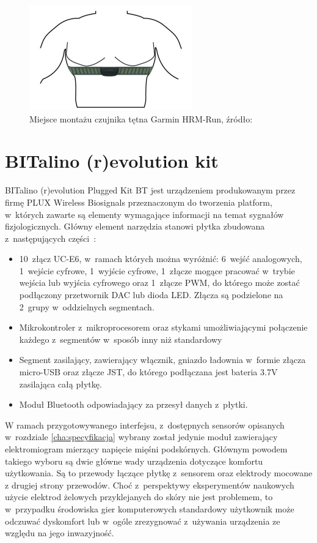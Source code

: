 \begin{figure}
	\centering
	\includegraphics[width=0.5\linewidth]{images/garmin_hrm_placement.png}
	\caption{Miejsce montażu czujnika tętna Garmin HRM-Run, źródło:~\cite{garmin_manual}}
	\label{fig:garmin_placement}
\end{figure}

\section{BITalino (r)evolution kit}
BITalino (r)evolution Plugged Kit BT jest urządzeniem produkowanym przez firmę PLUX Wireless Biosignals przeznaczonym do tworzenia platform, w~których zawarte są elementy wymagające informacji na temat sygnałów fizjologicznych. Główny element narzędzia stanowi płytka zbudowana z~następujących części~\cite{bitalino_documentation}:
\begin{itemize}
	\item 10~złącz UC-E6, w~ramach których można wyróżnić: 6~wejść analogowych, 1~wejście cyfrowe, 1~wyjście cyfrowe, 1~złącze mogące pracować w~trybie wejścia lub wyjścia cyfrowego oraz 1~złącze PWM, do którego może zostać podłączony przetwornik DAC lub dioda LED. Złącza są podzielone na 2~grupy w~oddzielnych segmentach.
	\item Mikrokontroler z~mikroprocesorem oraz stykami umożliwiającymi połączenie każdego z~segmentów w~sposób inny niż standardowy
	\item Segment zasilający, zawierający włącznik, gniazdo ładownia w~formie złącza micro-USB oraz złącze JST, do którego podłączana jest bateria 3.7V zasilająca całą płytkę.
	\item Moduł Bluetooth odpowiadający za przesył danych z~płytki.
\end{itemize}

W ramach przygotowywanego interfejsu, z~dostępnych sensorów opisanych w~rozdziale \ref{cha:specyfikacja} wybrany został jedynie moduł zawierający elektromiogram mierzący napięcie mięśni podskórnych. Głównym powodem takiego wyboru są dwie główne wady urządzenia dotyczące komfortu użytkowania. Są to przewody łączące płytkę z~sensorem oraz elektrody mocowane z drugiej strony przewodów. Choć z~perspektywy eksperymentów naukowych użycie elektrod żelowych przyklejanych do skóry nie jest problemem, to w~przypadku środowiska gier komputerowych standardowy użytkownik może odczuwać dyskomfort lub w~ogóle zrezygnować z~używania urządzenia ze względu na jego inwazyjność.

